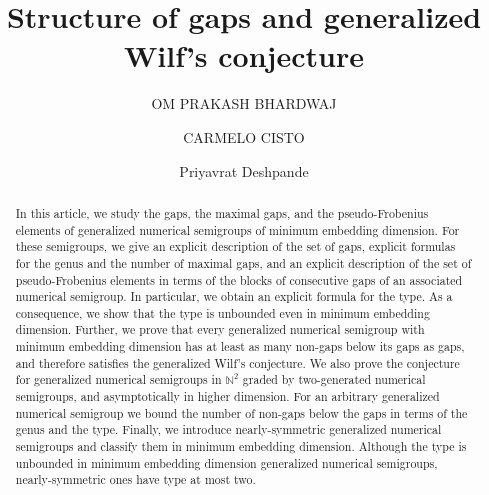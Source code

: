 \documentclass[12pt]{amsart}
\theoremstyle{plain}
\theoremstyle{theorem}
\theoremstyle{remark}
\begin{document}
		
		\title[Structure of gaps and generalized Wilf's conjecture]{Structure of gaps and generalized Wilf's conjecture}
		
			\author{OM PRAKASH BHARDWAJ}
		\address{Chennai Mathematical Institute, Tamil Nadu - 603103, India}
		
		
		\author{CARMELO CISTO}
		\address{Universit\`{a} di Messina, Dipartimento di Scienze Matematiche e Informatiche, Scienze Fisiche e Scienze della Terra\\
			Viale Ferdinando Stagno D'Alcontres 31\\
			98166 Messina, Italy}
		
		\author{Priyavrat Deshpande}
		\address{Chennai Mathematical Institute, Tamil Nadu - 603103, India}

		
	
		
		\begin{abstract}
 In this article, we study the gaps, the maximal gaps, and the pseudo-Frobenius elements of generalized numerical semigroups of minimum embedding dimension. For these semigroups, we give an explicit description of the set of gaps, explicit formulas for the genus and the number of maximal gaps, and an explicit description of the set of pseudo-Frobenius elements in terms of the blocks of consecutive gaps of an associated numerical semigroup. In particular, we obtain an explicit formula for the type. As a consequence, we show that the type is unbounded even in minimum embedding dimension. Further, we prove that every generalized numerical semigroup with minimum embedding dimension has at least as many non-gaps below its gaps as gaps, and therefore satisfies the generalized Wilf's conjecture. We also prove the conjecture for generalized numerical semigroups in $\mathbb{N}^2$ graded by two-generated numerical semigroups, and asymptotically in higher dimension. For an arbitrary generalized numerical semigroup we bound the number of non-gaps below the gaps in terms of the genus and the type. Finally, we introduce nearly-symmetric generalized numerical semigroups and classify them in minimum embedding dimension. Although the type is unbounded in minimum embedding dimension generalized numerical semigroups, nearly-symmetric ones have type at most two.
  	\end{abstract}
		
\end{document}
